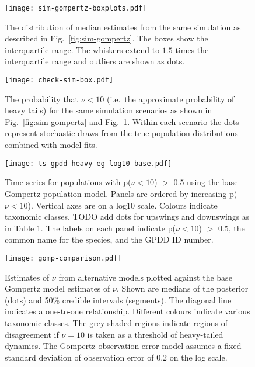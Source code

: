 \documentclass[12pt]{article}
\begin{document}
\begin{figure}[htbp]
\begin{center}
\texttt{[image: sim-gompertz-boxplots.pdf]}
\caption{The distribution of median estimates from the same simulation as described in Fig.~\ref{fig:sim-gompertz}. The boxes show the interquartile range. The whiskers extend to $1.5$ times the interquartile range and outliers are shown as dots.}
\label{fig:sim-gompertz-boxplots}
\end{center}
\end{figure}


\begin{figure}[htbp]
\begin{center}
\texttt{[image: check-sim-box.pdf]}
\caption{The probability that $\nu < 10$ (i.e.\ the approximate probability of heavy tails) for the same simulation scenarios as shown in Fig.~\ref{fig:sim-gompertz} and Fig.~\ref{fig:sim-gompertz-boxplots}. Within each scenario the dots represent stochastic draws from the true population distributions combined with model fits.}
\label{fig:sim-prob}
\end{center}
\end{figure}


\begin{figure}[htbp]
\begin{center}
\texttt{[image: ts-gpdd-heavy-eg-log10-base.pdf]}
\caption{Time series for populations with p($\nu < 10$) $>$ 0.5 using the base Gompertz population model. Panels are ordered by increasing p($\nu < 10$). Vertical axes are on a log10 scale. Colours indicate taxonomic classes. TODO add dots for upswings and downswings as in Table 1. The labels on each panel indicate p($\nu < 10$) $>$ 0.5, the common name for the species, and the GPDD ID number.}
\label{fig:heavy-ts}
\end{center}
\end{figure}

\clearpage

\begin{figure}[htbp]
\begin{center}
\texttt{[image: gomp-comparison.pdf]}
\caption{Estimates of $\nu$ from alternative models plotted against the base Gompertz model estimates of $\nu$. Shown are medians of the posterior (dots) and 50\% credible intervals (segments). The diagonal line indicates a one-to-one relationship. Different colours indicate various taxonomic classes. The grey-shaded regions indicate regions of disagreement if $\nu = 10$ is taken as a threshold of heavy-tailed dynamics. The Gompertz observation error model assumes a fixed standard deviation of observation error of $0.2$ on the log scale.}
\label{fig:alt}
\end{center}
\end{figure}
\end{document}
